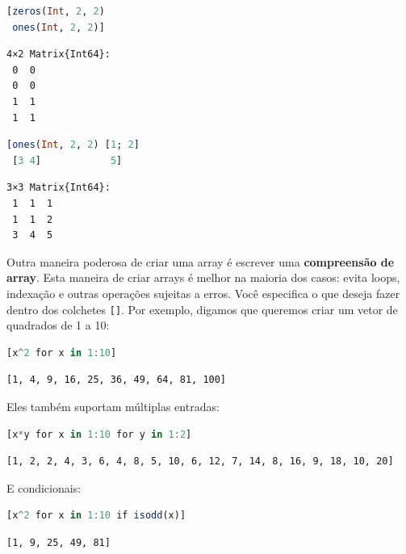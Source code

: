 \documentclass[
  notoc %
]{tufte-book}
\newcommand{\passthrough}[1]{#1}
\begin{document}
\begin{lstlisting}[language=Julia]
[zeros(Int, 2, 2)
 ones(Int, 2, 2)]
\end{lstlisting}

\begin{lstlisting}[language=Output]
4×2 Matrix{Int64}:
 0  0
 0  0
 1  1
 1  1
\end{lstlisting}

\begin{lstlisting}[language=Julia]
[ones(Int, 2, 2) [1; 2]
 [3 4]            5]
\end{lstlisting}

\begin{lstlisting}[language=Output]
3×3 Matrix{Int64}:
 1  1  1
 1  1  2
 3  4  5
\end{lstlisting}

Outra maneira poderosa de criar uma array é escrever uma
\textbf{compreensão de array}. Esta maneira de criar arrays é melhor na
maioria dos casos: evita loops, indexação e outras operações sujeitas a
erros. Você especifica o que deseja fazer dentro dos colchetes
\passthrough{\lstinline![]!}. Por exemplo, digamos que queremos criar um
vetor de quadrados de 1 a 10:

\begin{lstlisting}[language=Julia]
[x^2 for x in 1:10]
\end{lstlisting}

\begin{lstlisting}[language=Output]
[1, 4, 9, 16, 25, 36, 49, 64, 81, 100]
\end{lstlisting}

Eles também suportam múltiplas entradas:

\begin{lstlisting}[language=Julia]
[x*y for x in 1:10 for y in 1:2]
\end{lstlisting}

\begin{lstlisting}[language=Output]
[1, 2, 2, 4, 3, 6, 4, 8, 5, 10, 6, 12, 7, 14, 8, 16, 9, 18, 10, 20]
\end{lstlisting}

E condicionais:

\begin{lstlisting}[language=Julia]
[x^2 for x in 1:10 if isodd(x)]
\end{lstlisting}

\begin{lstlisting}[language=Output]
[1, 9, 25, 49, 81]
\end{lstlisting}
\end{document}
